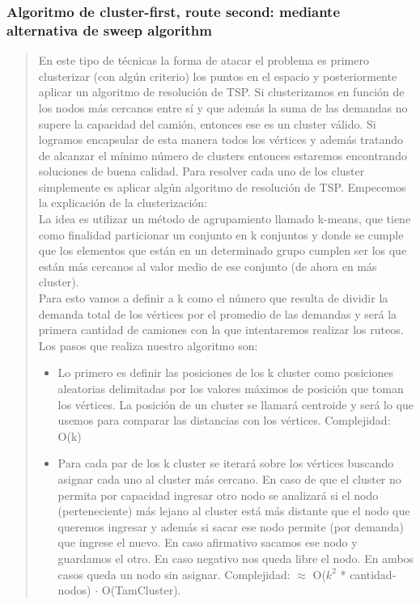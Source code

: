 \documentclass[11pt,a4paper]{article}
\begin{document}
\subsubsection{Algoritmo de cluster-first, route second: mediante alternativa de sweep algorithm}
\begin{verse}

En este tipo de técnicas la forma de atacar el problema es primero clusterizar (con algún criterio) los puntos en el espacio y posteriormente aplicar un algoritmo de resolución de TSP. Si clusterizamos en función de los nodos más cercanos entre sí y que además la suma de las demandas no supere la capacidad del camión, entonces ese es un cluster válido. Si logramos encapsular de esta manera todos los vértices y además tratando de alcanzar el mínimo número de clusters entonces estaremos encontrando soluciones de buena  calidad. Para resolver cada uno de los cluster simplemente es aplicar algún algoritmo de resolución de TSP. Empecemos la explicación de la clusterización:\\
La idea es utilizar un método de agrupamiento llamado k-means, que tiene como finalidad particionar un conjunto en k conjuntos y donde se cumple que los elementos que están en un determinado grupo cumplen ser los que están más cercanos al valor medio de ese conjunto (de ahora en más cluster). \\
Para esto vamos a definir a k como el número que resulta de dividir la demanda total de los vértices por el promedio de las demandas y será la primera cantidad de camiones con la que intentaremos realizar los ruteos. Los pasos que realiza nuestro algoritmo son:
\begin{itemize}
\item Lo primero es definir las posiciones de los k cluster como posiciones aleatorias delimitadas por los valores máximos de posición que toman los vértices. La posición de un cluster se llamará centroide y será lo que usemos para comparar las distancias con los vértices. Complejidad: O(k)
\item Para cada par de los k cluster se iterará sobre los vértices buscando asignar cada uno al cluster más cercano. En caso de que el cluster no permita por capacidad ingresar otro nodo se analizará si el nodo (perteneciente) más lejano al cluster está más distante que el nodo que queremos ingresar y además si sacar ese nodo permite (por demanda) que ingrese el nuevo. En caso afirmativo sacamos ese nodo y guardamos el otro. En caso negativo nos queda libre el nodo. En ambos casos queda un nodo sin asignar. Complejidad: $\approx$ O($k^{2}$ * cantidad-nodos) $\cdot$ O(TamCluster).

\end{itemize}
\end{verse}
\end{document}
